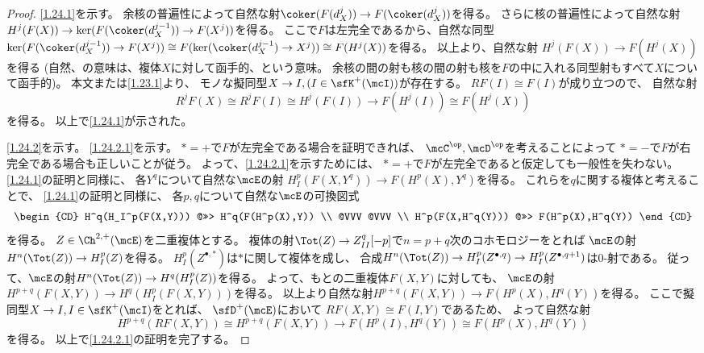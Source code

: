 \documentclass[uplatex,dvipdfmx]{jsarticle}
\begin{document}
\begin{proof}
  \ref{1.24.1}を示す。
  余核の普遍性によって自然な射\(\coker(F(d_X^j)) \to F(\coker(d_X^j))\)を得る。
  さらに核の普遍性によって自然な射
  \(H^j(F(X)) \to \ker(F(\coker(d_X^{j-1}))\to F(X^j))\)を得る。
  ここで\(F\)は左完全であるから、自然な同型
  \(\ker(F(\coker(d_X^{j-1}))\to F(X^j)) \cong
  F(\ker(\coker(d_X^{j-1})\to X^j)) \cong F(H^j(X))\)を得る。
  以上より、自然な射
  \(H^j(F(X)) \to F(H^j(X))\)を得る
  (自然、の意味は、複体\(X\)に対して函手的、という意味。
  余核の間の射も核の間の射も核を\(F\)の中に入れる同型射もすべて\(X\)について函手的)。
  本文\cite[Proposition 1.7.7]{kashiwara2002sheaves}または\autoref{1.23.1}より、
  モノな擬同型\(X\to I, (I\in \sfK^+(\mcI))\)が存在する。
  \(RF(I)\cong F(I)\)が成り立つので、
  自然な射
  \[R^jF(X) \cong R^jF(I) \cong H^j(F(I)) \to F(H^j(I)) \cong F(H^j(X))\]
  を得る。
  以上で\ref{1.24.1}が示された。

  \ref{1.24.2}を示す。
  \ref{1.24.2.1}を示す。
  \(*=+\)で\(F\)が左完全である場合を証明できれば、
  \(\mcC^{\op},\mcD^{\op}\)を考えることによって
  \(*=-\)で\(F\)が右完全である場合も正しいことが従う。
  よって、\ref{1.24.2.1}を示すためには、
  \(*=+\)で\(F\)が左完全であると仮定しても一般性を失わない。
  \ref{1.24.1}の証明と同様に、
  各\(Y^q\)について自然な\(\mcE\)の射
  \(H_I^p(F(X,Y^q)) \to F(H^p(X),Y^q)\)を得る。
  これらを\(q\)に関する複体と考えることで、
  \ref{1.24.1}の証明と同様に、
  各\(p,q\)について自然な\(\mcE\)の可換図式
  \[
  \begin{CD}
    H^q(H_I^p(F(X,Y))) @>>> H^q(F(H^p(X),Y)) \\
    @VVV @VVV \\
    H^p(F(X,H^q(Y))) @>>> F(H^p(X),H^q(Y))
  \end{CD}
  \]
  を得る。
  \(Z\in \Ch^{2,+}(\mcE)\)を二重複体とする。
  複体の射\(\Tot(Z) \to Z^q_{II}[-p]\)で\(n=p+q\)次のコホモロジーをとれば
  \(\mcE\)の射\(H^n(\Tot(Z)) \to H_I^p(Z)\)を得る。
  \(H_I^p(Z^{\bullet,*})\)は\(*\)に関して複体を成し、
  合成\(H^n(\Tot(Z)) \to H_I^p(Z^{\bullet,q})\to H_I^p(Z^{\bullet,q+1})\)は\(0\)-射である。
  従って、\(\mcE\)の射\(H^n(\Tot(Z)) \to H^q(H_I^p(Z))\)を得る。
  よって、もとの二重複体\(F(X,Y)\)に対しても、
  \(\mcE\)の射
  \(H^{p+q}(F(X,Y)) \to H^q(H_I^p(F(X,Y)))\)を得る。
  以上より自然な射\(H^{p+q}(F(X,Y))\to F(H^p(X),H^q(Y))\)を得る。
  ここで擬同型\(X\to I,I\in\sfK^+(\mcI)\)をとれば、
  \(\sfD^+(\mcE)\)において
  \(RF(X,Y)\cong F(I,Y)\)であるため、
  よって自然な射
  \[H^{p+q}(RF(X,Y)) \cong H^{p+q}(F(X,Y)) \to F(H^p(I),H^q(Y)) \cong F(H^p(X),H^q(Y))\]
  を得る。
  以上で\ref{1.24.2.1}の証明を完了する。


\end{proof}
\end{document}
